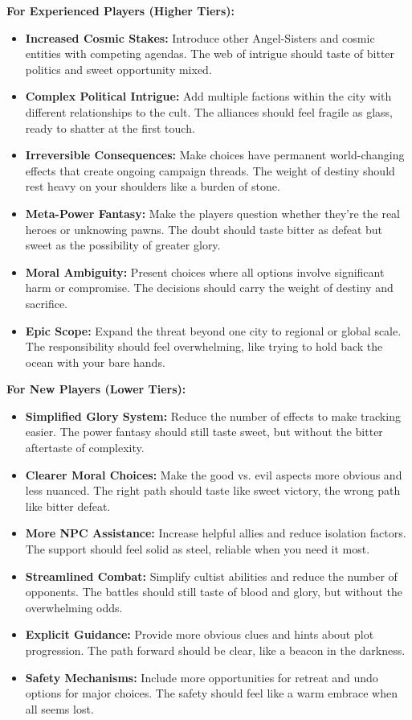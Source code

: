 \documentclass[11pt]{article}
\begin{document}
\textbf{For Experienced Players (Higher Tiers):}
\begin{itemize}
\item \textbf{Increased Cosmic Stakes:} Introduce other Angel-Sisters and cosmic entities with competing agendas. The web of intrigue should taste of bitter politics and sweet opportunity mixed.
\item \textbf{Complex Political Intrigue:} Add multiple factions within the city with different relationships to the cult. The alliances should feel fragile as glass, ready to shatter at the first touch.
\item \textbf{Irreversible Consequences:} Make choices have permanent world-changing effects that create ongoing campaign threads. The weight of destiny should rest heavy on your shoulders like a burden of stone.
\item \textbf{Meta-Power Fantasy:} Make the players question whether they're the real heroes or unknowing pawns. The doubt should taste bitter as defeat but sweet as the possibility of greater glory.
\item \textbf{Moral Ambiguity:} Present choices where all options involve significant harm or compromise. The decisions should carry the weight of destiny and sacrifice.
\item \textbf{Epic Scope:} Expand the threat beyond one city to regional or global scale. The responsibility should feel overwhelming, like trying to hold back the ocean with your bare hands.
\end{itemize}

\textbf{For New Players (Lower Tiers):}
\begin{itemize}
\item \textbf{Simplified Glory System:} Reduce the number of effects to make tracking easier. The power fantasy should still taste sweet, but without the bitter aftertaste of complexity.
\item \textbf{Clearer Moral Choices:} Make the good vs. evil aspects more obvious and less nuanced. The right path should taste like sweet victory, the wrong path like bitter defeat.
\item \textbf{More NPC Assistance:} Increase helpful allies and reduce isolation factors. The support should feel solid as steel, reliable when you need it most.
\item \textbf{Streamlined Combat:} Simplify cultist abilities and reduce the number of opponents. The battles should still taste of blood and glory, but without the overwhelming odds.
\item \textbf{Explicit Guidance:} Provide more obvious clues and hints about plot progression. The path forward should be clear, like a beacon in the darkness.
\item \textbf{Safety Mechanisms:} Include more opportunities for retreat and undo options for major choices. The safety should feel like a warm embrace when all seems lost.
\end{itemize}
\end{document}
